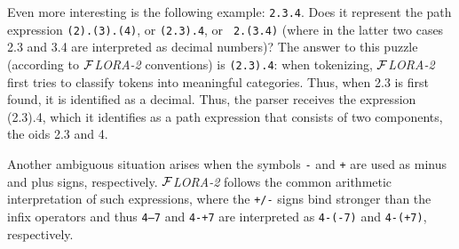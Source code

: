 \documentclass[11pt]{article}
\newcommand{\FLORA}{{\mbox{${\cal F}${\small\it LORA}\rm\emph{-2}}}\xspace}
\begin{document}
Even more interesting is the following example: {\tt 2.3.4}. Does it
represent the path expression {\tt (2).(3).(4)}, or {\tt (2.3).4}, or {\tt
  2.(3.4)} (where in the latter two cases 2.3 and 3.4 are interpreted as
decimal numbers)? The answer to this puzzle (according to \FLORA conventions)
is {\tt (2.3).4}: when
tokenizing, \FLORA first tries to classify tokens into meaningful
categories. Thus, when 2.3 is first found, it is identified as a
decimal. Thus, the parser receives the expression (2.3).4, which it
identifies as a path expression that consists of two components, the oids
2.3 and 4.

Another ambiguous situation arises when the symbols {\tt -} and {\tt +} are
used as minus and plus
signs, respectively. \FLORA follows the common arithmetic interpretation of
such expressions, where the {\tt +/-} signs bind stronger than the infix
operators and thus
{\tt 4--7} and {\tt 4-+7} are interpreted as {\tt 4-(-7)} and {\tt 4-(+7)},
respectively.
\end{document}
